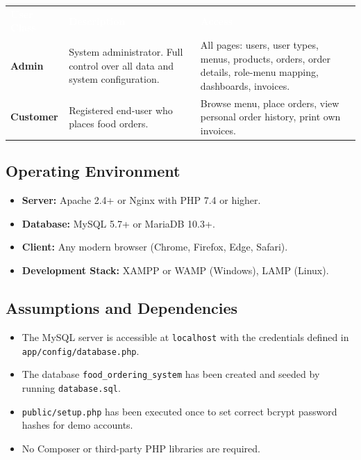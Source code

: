 \documentclass[12pt,a4paper]{article}
\newcommand{\thead}[1]{\textbf{\textcolor{white}{#1}}}
\newcommand{\code}[1]{\texttt{\footnotesize\colorbox{codebg}{#1}}}
\begin{document}
\begin{tabularx}{\linewidth}{@{} L{2.5cm} L{4.5cm} X @{}}
  \thead{User Class} & \thead{Description} & \thead{Access} \\
  \textbf{Admin}
    & System administrator. Full control over all data and system configuration.
    & All pages: users, user types, menus, products, orders, order details,
      role-menu mapping, dashboards, invoices. \\
  \textbf{Customer}
    & Registered end-user who places food orders.
    & Browse menu, place orders, view personal order history, print own invoices. \\
\end{tabularx}

\subsection{Operating Environment}

\begin{itemize}[leftmargin=1.5em, itemsep=3pt]
  \item \textbf{Server:} Apache 2.4+ or Nginx with PHP 7.4 or higher.
  \item \textbf{Database:} MySQL 5.7+ or MariaDB 10.3+.
  \item \textbf{Client:} Any modern browser (Chrome, Firefox, Edge, Safari).
  \item \textbf{Development Stack:} XAMPP or WAMP (Windows), LAMP (Linux).
\end{itemize}

\subsection{Assumptions and Dependencies}

\begin{itemize}[leftmargin=1.5em, itemsep=3pt]
  \item The MySQL server is accessible at \code{localhost} with the credentials
        defined in \code{app/config/database.php}.
  \item The database \code{food\_ordering\_system} has been created and seeded
        by running \code{database.sql}.
  \item \code{public/setup.php} has been executed once to set correct bcrypt
        password hashes for demo accounts.
  \item No Composer or third-party PHP libraries are required.
\end{itemize}
\end{document}
